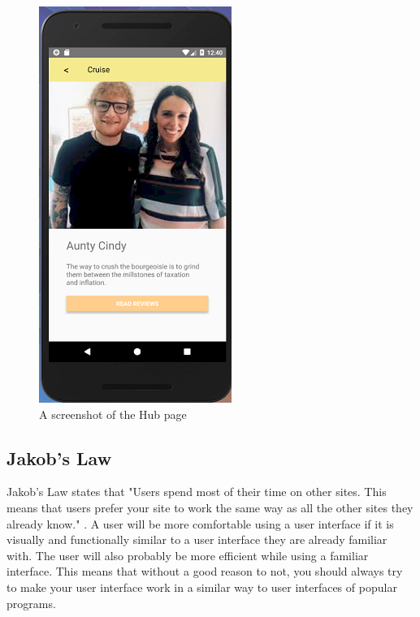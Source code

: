 \documentclass[a4paper, 11pt]{article}
\begin{document}
\begin{figure}
\begin{minipage}{.55\textwidth}
  \includegraphics[width=.7\linewidth]{cindy.png}
  \caption{A screenshot of the Hub page}
  \label{fig:test2}
\end{minipage}
\end{figure}
\subsection{Jakob's Law}

Jakob's Law states that "Users spend most of their time on other sites. This means that users prefer your site to work the same way as all the other sites they already know." \cite{jakobs}. A user will be more comfortable using a user interface if it is visually and functionally similar to a user interface they are already familiar with. The user will also probably be more efficient while using a familiar interface. This means that without a good reason to not, you should always try to make your user interface work in a similar way to user interfaces of popular programs.
\end{document}
